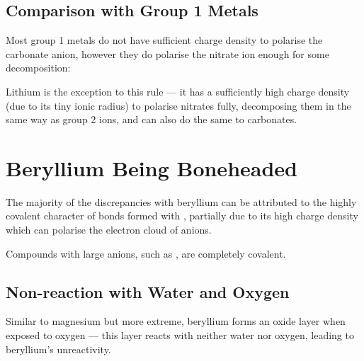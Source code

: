 



		\subsection{Comparison with Group 1 Metals}

			Most group 1 metals do not have sufficient charge density to polarise the
			carbonate anion, however they do polarise the nitrate ion enough for some decomposition:


			Lithium is the exception to this rule --- it has a sufficiently high charge density (due to its
			tiny ionic radius) to polarise nitrates fully, decomposing them in the same way as group 2 ions, and
			can also do the same to carbonates.





	\pagebreak
	\section{Beryllium Being Boneheaded}

		The majority of the discrepancies with beryllium can be attributed to the highly covalent character
		of bonds formed with , partially due to its high charge density which can polarise the electron
		cloud of anions.

		Compounds with large anions, such as , are completely covalent.



		\subsection{Non-reaction with Water and Oxygen}

			Similar to magnesium but more extreme, beryllium forms an  oxide layer when
			exposed to oxygen --- this layer reacts with neither water nor oxygen, leading to beryllium's unreactivity.

